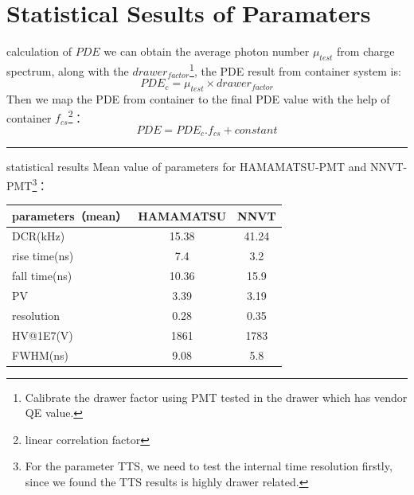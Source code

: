 \section{Statistical Sesults of Paramaters}
\begin{frame}{calculation of $PDE$}
we can obtain the average photon number $\mu_{test}$ from charge spectrum, along with the $drawer_{factor}$\footnote{Calibrate the drawer factor using PMT tested in the drawer which has vendor QE value.}, the PDE result from container system is:
\begin{equation}
PDE_{c}=\mu_{test}\times drawer_{factor}
\end{equation}
Then we map the PDE from container to the final PDE value with the help of container $f_{cs}$\footnote{linear correlation factor}：
\begin{equation}
PDE=PDE_{c}.f_{cs}+constant
\label{pde_formula}
\end{equation}
\vspace{.5cm}
\hrule{\textwidth}
\vspace{.5cm}

\end{frame}
\begin{frame}{statistical results}
Mean value of parameters for HAMAMATSU-PMT and NNVT-PMT\footnote{For the parameter TTS, we need to test the internal time resolution firstly, since we found the TTS results is highly drawer related.}：

\vspace{.5cm}

\centering
\begin{tabular}{l|c|c}
\hline
\hline
parameters（mean）&  {\color{Blue} HAMAMATSU} & {\color{Blue}NNVT} \\\hline
DCR(kHz)&15.38&41.24\\
rise time(ns)&7.4& 3.2\\
fall time(ns)&10.36& 15.9\\
PV&3.39& 3.19\\
resolution&0.28& 0.35\\
HV@1E7(V)&1861& 1783\\
FWHM(ns)&9.08& 5.8\\
\hline
\end{tabular}
\end{frame}
